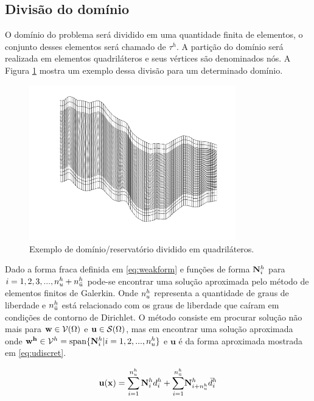 \subsection{Divisão do domínio}

O domínio do problema será dividido em uma quantidade finita de elementos, o conjunto desses elementos será chamado de $\tau^h$.  A partição do domínio será realizada em elementos quadriláteros e seus vértices são denominados nós. A Figura \ref{fig:elemento} mostra um exemplo dessa divisão para um determinado domínio.

\begin{figure}[!htbp]
\centering
\includegraphics[width=0.8\textwidth]{chap01/figs/exemplo_dominio.png}
\caption{Exemplo de domínio/reservatório dividido em quadriláteros.}
\label{fig:elemento}
\end{figure}


Dado a forma fraca definida em \eqref{eq:weakform} e funções de forma ${\mathbf{N}_{i}^h}$ para $i = 1, 2, 3, ..., n_u^h + n_{\bar{u}}^h$ pode-se encontrar uma solução aproximada pelo método de elementos finitos de Galerkin. Onde $n_u^h$ representa a quantidade de graus de liberdade e $n_{\bar{u}}^h$ está relacionado com os graus de liberdade que caíram em condições de contorno de Dirichlet. O método consiste em procurar solução não mais para $\mathbf{w} \in \mathcal{V}(\Omega)$ e $\mathbf{u} \in \mathcal{S}(\Omega)$, mas em encontrar uma solução aproximada onde  $\mathbf{w^h} \in \mathcal{V}^h = \text{span}\{ {\mathbf{N}_{i}^h} | i = 1,2, ..., n_u^h  \}$ e $\mathbf{u}$ é  da forma aproximada mostrada em \eqref{eq:udiscret}. 

\begin{equation}\label{eq:udiscret}
\mathbf{u}(\mathbf{x}) = \sum_{i=1}^{n_u^h} {\mathbf{N}_{i}^h}  d_i^h + {\sum_{i=1}^ {n^h_{\bar{u}}}}  \mathbf{N}_{i+n_u^h}^h \bar{d}_i^h
\end{equation}


